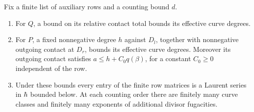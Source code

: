 \begin{lemma}\label{cap:bounded-rows}
Fix a finite list of auxiliary rows and a counting bound $d$.
\begin{enumerate}[label=\textup{(\roman*)}]
\item For $Q$, a bound on its relative contact total bounds its
      effective curve degrees.
\item For $P$, a fixed nonnegative degree $h$ against $D_l$, together
      with nonnegative outgoing contact at $D_r$, bounds its effective
      curve degrees.  Moreover its outgoing contact satisfies
      $a\leq h+C_0q(\beta)$, for a constant $C_0\geq0$ independent of
      the row.
\item Under these bounds every entry of the finite row matrices is a
      Laurent series in $\hbar$ bounded below.  At each counting order
      there are finitely many curve classes and finitely many
      exponents of additional divisor fugacities.
\end{enumerate}
\end{lemma}
